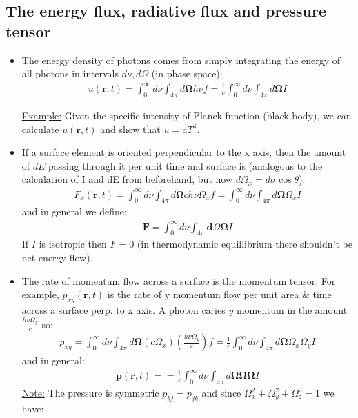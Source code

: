 \documentclass[15pt]{article}
\begin{document}
\subsection{The energy flux, radiative flux and pressure tensor}
\begin{itemize}
    \item The energy density of photons comes from simply integrating the energy of all photons in intervals $d\nu,d\Omega$ (in phase space):
    \begin{align}
         u(\bm r,t) = \int_0^\infty d\nu\int_{4\pi} d\bm\Omega h\nu f=\frac{1}{c}\int_0^\infty d\nu \int_{4\pi}d\bm\Omega I
    \end{align}
    
    \underline{Example:} Given the specific intensity of Planck function (black body), we can calculate $u(\bm r,t)$ and show that $u=aT^4$.
    \item If a surface element is oriented perpendicular to the x axis, then the amount of $dE$ passing through it per unit time and surface is (analogous to the calculation of I and dE from beforehand, but now $d\Omega_x=d\sigma\cos\theta$):
\begin{align}
        F_x (\bm r,t)= \int_0^\infty d\nu\int_{4\pi}d\bm\Omega ch\nu\Omega_xf=\int_0^\infty d\nu \int_{4\pi} d\bm\Omega \Omega_x I
\end{align}
and in general we define:
\begin{align}
    \bm F=\int_0^\infty d\nu \int_{4\pi} \bm d\Omega \bm \Omega I
\end{align}
If $I$ is isotropic then $F=0$ (in thermodynamic equillibrium there shouldn't be net energy flow).
\item The rate of momentum flow across a surface is the momentum tensor. For example, $p_{xy}(\bm r,t)$ is the rate of y momentum flow per unit area \& time across a surface perp. to x axis. A photon caries $y$ momentum in the amount $\frac{h\nu\Omega_y}{c}$ so:
\begin{align}
    p_{xy}=\int_0^\infty d\nu \int_{4\pi} d\bm\Omega (c\Omega_x)\left(\frac{h\nu\Omega_y}{c}\right) f=\frac{1}{c}\int_0^\infty d\nu \int_{4\pi} d\bm\Omega \Omega_x\Omega_y I
\end{align}
and in general:
\begin{align}
    \bm p(\bm r,t)==\frac{1}{c}\int_0^\infty d\nu \int_{4\pi} d\bm\Omega \bm\Omega \bm\Omega I
\end{align}
\underline{Note:} The pressure is symmetric $p_{kj}=p_{jk}$ and since $\Omega_x^2+\Omega_y^2+\Omega_z^2=1$ we have:

\end{itemize}
\end{document}

